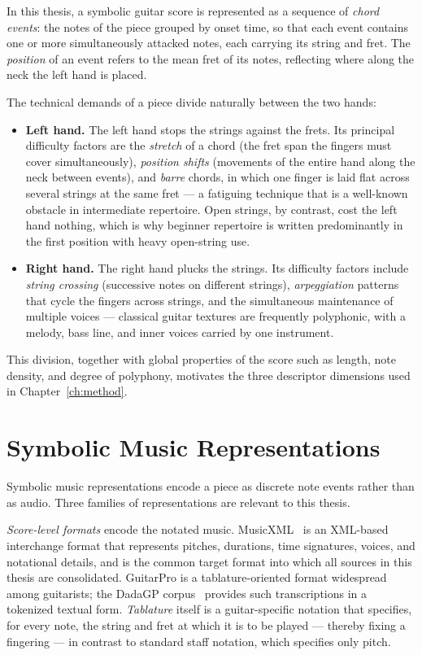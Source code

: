 In this thesis, a symbolic guitar score is represented as a sequence of \emph{chord events}: the notes of the piece grouped by onset time, so that each event contains one or more simultaneously attacked notes, each carrying its string and fret. The \emph{position} of an event refers to the mean fret of its notes, reflecting where along the neck the left hand is placed.

The technical demands of a piece divide naturally between the two hands:
\begin{itemize}
    \item \textbf{Left hand.} The left hand stops the strings against the frets. Its principal difficulty factors are the \emph{stretch} of a chord (the fret span the fingers must cover simultaneously), \emph{position shifts} (movements of the entire hand along the neck between events), and \emph{barre} chords, in which one finger is laid flat across several strings at the same fret --- a fatiguing technique that is a well-known obstacle in intermediate repertoire. Open strings, by contrast, cost the left hand nothing, which is why beginner repertoire is written predominantly in the first position with heavy open-string use.
    \item \textbf{Right hand.} The right hand plucks the strings. Its difficulty factors include \emph{string crossing} (successive notes on different strings), \emph{arpeggiation} patterns that cycle the fingers across strings, and the simultaneous maintenance of multiple voices --- classical guitar textures are frequently polyphonic, with a melody, bass line, and inner voices carried by one instrument.
\end{itemize}
This division, together with global properties of the score such as length, note density, and degree of polyphony, motivates the three descriptor dimensions used in Chapter~\ref{ch:method}.

\section{Symbolic Music Representations}
\label{sec:prelim_representations}
Symbolic music representations encode a piece as discrete note events rather than as audio. Three families of representations are relevant to this thesis.

\emph{Score-level formats} encode the notated music. MusicXML~\cite{good2001musicxml} is an XML-based interchange format that represents pitches, durations, time signatures, voices, and notational details, and is the common target format into which all sources in this thesis are consolidated. GuitarPro is a tablature-oriented format widespread among guitarists; the DadaGP corpus~\cite{sarmento2021dadagp} provides such transcriptions in a tokenized textual form. \emph{Tablature} itself is a guitar-specific notation that specifies, for every note, the string and fret at which it is to be played --- thereby fixing a fingering --- in contrast to standard staff notation, which specifies only pitch.

